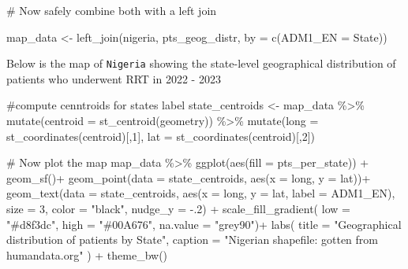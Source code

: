 \documentclass[
  letterpaper,
  DIV=11,
  numbers=noendperiod]{scrartcl}
\newenvironment{Shaded}{\begin{snugshade}}{\end{snugshade}}
\newcommand{\AttributeTok}[1]{\textcolor[rgb]{0.40,0.45,0.13}{#1}}
\newcommand{\CommentTok}[1]{\textcolor[rgb]{0.37,0.37,0.37}{#1}}
\newcommand{\DecValTok}[1]{\textcolor[rgb]{0.68,0.00,0.00}{#1}}
\newcommand{\FunctionTok}[1]{\textcolor[rgb]{0.28,0.35,0.67}{#1}}
\newcommand{\NormalTok}[1]{\textcolor[rgb]{0.00,0.23,0.31}{#1}}
\newcommand{\OtherTok}[1]{\textcolor[rgb]{0.00,0.23,0.31}{#1}}
\newcommand{\SpecialCharTok}[1]{\textcolor[rgb]{0.37,0.37,0.37}{#1}}
\newcommand{\StringTok}[1]{\textcolor[rgb]{0.13,0.47,0.30}{#1}}
\begin{document}
\begin{Shaded}
\begin{Highlighting}[]
\CommentTok{\# Now safely combine both with a left join}

\NormalTok{map\_data }\OtherTok{\textless{}{-}} \FunctionTok{left\_join}\NormalTok{(nigeria, pts\_geog\_distr, }\AttributeTok{by =} \FunctionTok{c}\NormalTok{(}\StringTok{\textquotesingle{}ADM1\_EN\textquotesingle{}} \OtherTok{=} \StringTok{\textquotesingle{}State\textquotesingle{}}\NormalTok{))}
\end{Highlighting}
\end{Shaded}

Below is the map of \texttt{Nigeria} showing the state-level
geographical distribution of patients who underwent RRT in 2022 - 2023

\begin{Shaded}
\begin{Highlighting}[]
\CommentTok{\#compute cenntroids for states label}
\NormalTok{state\_centroids }\OtherTok{\textless{}{-}}\NormalTok{ map\_data }\SpecialCharTok{\%\textgreater{}\%}
  \FunctionTok{mutate}\NormalTok{(}\AttributeTok{centroid =} \FunctionTok{st\_centroid}\NormalTok{(geometry)) }\SpecialCharTok{\%\textgreater{}\%}
  \FunctionTok{mutate}\NormalTok{(}\AttributeTok{long =} \FunctionTok{st\_coordinates}\NormalTok{(centroid)[,}\DecValTok{1}\NormalTok{],}
         \AttributeTok{lat  =} \FunctionTok{st\_coordinates}\NormalTok{(centroid)[,}\DecValTok{2}\NormalTok{])}

\CommentTok{\# Now plot the map}
\NormalTok{map\_data }\SpecialCharTok{\%\textgreater{}\%} 
  \FunctionTok{ggplot}\NormalTok{(}\FunctionTok{aes}\NormalTok{(}\AttributeTok{fill =}\NormalTok{ pts\_per\_state)) }\SpecialCharTok{+}
  \FunctionTok{geom\_sf}\NormalTok{()}\SpecialCharTok{+}
  \FunctionTok{geom\_point}\NormalTok{(}\AttributeTok{data =}\NormalTok{ state\_centroids, }\FunctionTok{aes}\NormalTok{(}\AttributeTok{x =}\NormalTok{ long, }\AttributeTok{y =}\NormalTok{ lat))}\SpecialCharTok{+}
  \FunctionTok{geom\_text}\NormalTok{(}\AttributeTok{data =}\NormalTok{ state\_centroids, }\FunctionTok{aes}\NormalTok{(}\AttributeTok{x =}\NormalTok{ long, }\AttributeTok{y =}\NormalTok{ lat, }\AttributeTok{label =}\NormalTok{ ADM1\_EN),}
            \AttributeTok{size =} \DecValTok{3}\NormalTok{, }\AttributeTok{color =} \StringTok{"black"}\NormalTok{, }\AttributeTok{nudge\_y =} \SpecialCharTok{{-}}\NormalTok{.}\DecValTok{2}\NormalTok{) }\SpecialCharTok{+}
  \FunctionTok{scale\_fill\_gradient}\NormalTok{(}
    \AttributeTok{low =} \StringTok{"\#d8f3dc"}\NormalTok{, }\AttributeTok{high =} \StringTok{"\#00A676"}\NormalTok{, }\AttributeTok{na.value =} \StringTok{"grey90"}\NormalTok{)}\SpecialCharTok{+}
  \FunctionTok{labs}\NormalTok{(}
    \AttributeTok{title =} \StringTok{"Geographical distribution of patients by State"}\NormalTok{,}
    \AttributeTok{caption =} \StringTok{"Nigerian shapefile: gotten from humandata.org"}
\NormalTok{  ) }\SpecialCharTok{+}
  \FunctionTok{theme\_bw}\NormalTok{()}
\end{Highlighting}
\end{Shaded}
\end{document}
